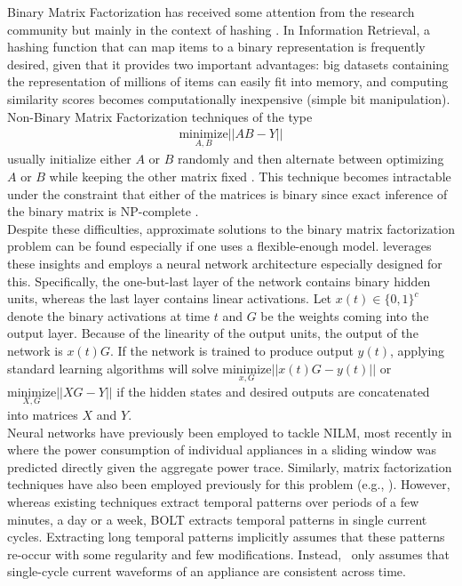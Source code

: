 Binary Matrix Factorization has received some attention from the research community but mainly in the context of hashing \cite{carreira2015hashing}. In Information Retrieval, a hashing function that can map items to a binary representation is frequently desired, given that it provides two important advantages: big datasets containing the representation of millions of items can easily fit into memory, and computing similarity scores becomes computationally inexpensive (simple bit manipulation).\\
Non-Binary Matrix Factorization techniques of the type
\begin{align*}
\underset{A,B}{\text{minimize}} ||AB - Y||
\end{align*}
 usually initialize either $A$ or $B$ randomly and then alternate between optimizing $A$ or $B$ while keeping the other matrix fixed \cite{sparse}. This technique becomes intractable under the constraint that either of the matrices is binary since exact inference of the binary matrix is NP-complete \cite{carreira2015hashing}.\\
Despite these difficulties, approximate solutions to the binary matrix factorization problem can be found especially if one uses a flexible-enough model. \ourname leverages these insights and employs a neural network architecture especially designed for this. Specifically, the one-but-last layer of the network contains binary hidden units, whereas the last layer contains linear activations. Let $x(t) \in \{0,1\}^c$ denote the binary activations at time $t$ and $G$ be the weights coming into the output layer. Because of the linearity of the output units, the output of the network is $x(t)G$. If the network is trained to produce output $y(t)$, applying standard learning algorithms will solve $\underset{x,G}{\text{minimize}} ||x(t)G - y(t)||$ or $\underset{X,G}{\text{minimize}} ||XG - Y||$ if the hidden states and desired outputs are concatenated into matrices $X$ and $Y$.\\
Neural networks have previously been employed to tackle NILM, most recently in \cite{kelly2015neural} where the power consumption of individual appliances in a sliding window was predicted directly given the aggregate power trace. Similarly, matrix factorization techniques have also been employed previously for this problem (e.g., \cite{sparse,matsumoto2016energy}). However, whereas existing techniques extract temporal patterns over periods of a few minutes, a day or a week, BOLT extracts temporal patterns in single current cycles. Extracting long temporal patterns implicitly assumes that these patterns re-occur with some regularity and few modifications. Instead, \ourname~only assumes that single-cycle current waveforms of an appliance are consistent across time.\\
